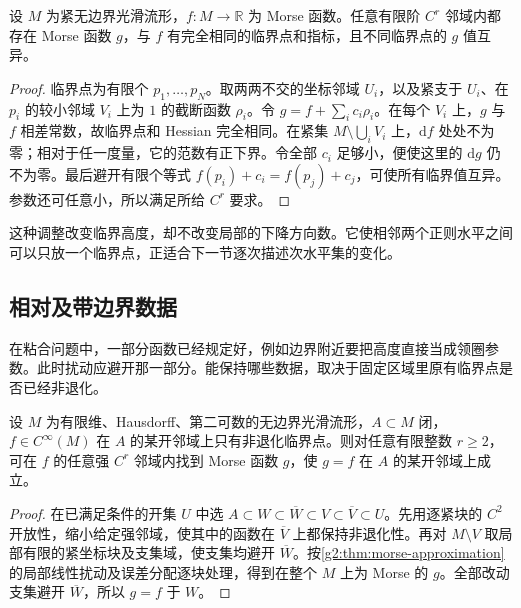 \begin{proposition}\label{g2:prop:distinct-morse-critical-values}
	设 \(M\) 为紧无边界光滑流形，\(f:M\to\mathbb R\) 为 Morse 函数。任意有限阶 \(C^r\) 邻域内都存在 Morse 函数 \(g\)，与 \(f\) 有完全相同的临界点和指标，且不同临界点的 \(g\) 值互异。
\end{proposition}
\begin{proof}
	临界点为有限个 \(p_1,\ldots,p_N\)。取两两不交的坐标邻域 \(U_i\)，以及紧支于 \(U_i\)、在 \(p_i\) 的较小邻域 \(V_i\) 上为 \(1\) 的截断函数 \(\rho_i\)。令 \(g=f+\sum_i c_i\rho_i\)。在每个 \(V_i\) 上，\(g\) 与 \(f\) 相差常数，故临界点和 Hessian 完全相同。在紧集 \(M\setminus\bigcup_iV_i\) 上，\(\mathrm df\) 处处不为零；相对于任一度量，它的范数有正下界。令全部 \(c_i\) 足够小，便使这里的 \(\mathrm dg\) 仍不为零。最后避开有限个等式 \(f(p_i)+c_i=f(p_j)+c_j\)，可使所有临界值互异。参数还可任意小，所以满足所给 \(C^r\) 要求。
\end{proof}

这种调整改变临界高度，却不改变局部的下降方向数。它使相邻两个正则水平之间可以只放一个临界点，正适合下一节逐次描述次水平集的变化。

\subsection{相对及带边界数据}
\label{g2:subsec:1701:04}

在粘合问题中，一部分函数已经规定好，例如边界附近要把高度直接当成领圈参数。此时扰动应避开那一部分。能保持哪些数据，取决于固定区域里原有临界点是否已经非退化。

\begin{proposition}\label{g2:prop:relative-morse-approximation}
	设 \(M\) 为有限维、Hausdorff、第二可数的无边界光滑流形，\(A\subset M\) 闭，\(f\in C^\infty(M)\) 在 \(A\) 的某开邻域上只有非退化临界点。则对任意有限整数 \(r\ge2\)，可在 \(f\) 的任意强 \(C^r\) 邻域内找到 Morse 函数 \(g\)，使 \(g=f\) 在 \(A\) 的某开邻域上成立。
\end{proposition}
\begin{proof}
	在已满足条件的开集 \(U\) 中选 \(A\subset W\subset\overline W\subset V\subset\overline V\subset U\)。先用逐紧块的 \(C^2\) 开放性，缩小给定强邻域，使其中的函数在 \(\overline V\) 上都保持非退化性。再对 \(M\setminus V\) 取局部有限的紧坐标块及支集域，使支集均避开 \(\overline W\)。按\cref{g2:thm:morse-approximation}的局部线性扰动及误差分配逐块处理，得到在整个 \(M\) 上为 Morse 的 \(g\)。全部改动支集避开 \(\overline W\)，所以 \(g=f\) 于 \(W\)。
\end{proof}

